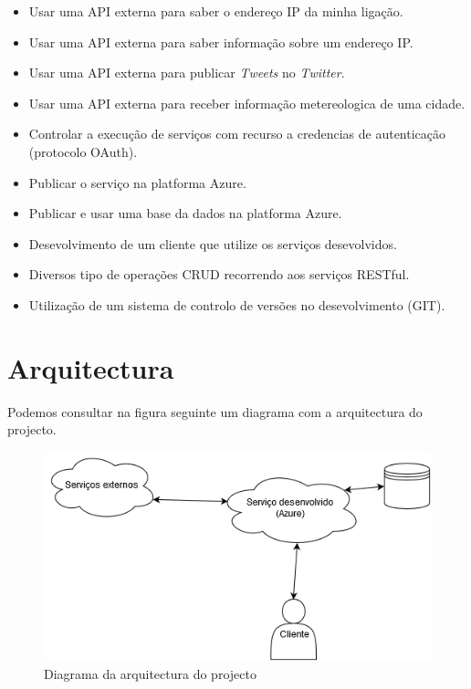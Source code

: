 \documentclass[11pt]{report}
\begin{document}
\begin{itemize}
\item Usar uma API externa para saber o endereço IP da minha ligação.
\item Usar uma API externa para saber informação sobre um endereço IP.
\item Usar uma API externa para publicar \textit{Tweets} no \textit{Twitter}.
\item Usar uma API externa para receber informação metereologica de uma cidade.
\item Controlar a execução de serviços com recurso a credencias de autenticação (protocolo OAuth).
\item Publicar o serviço na platforma Azure.
\item Publicar e usar uma base da dados na platforma Azure.
\item Desevolvimento de um cliente que utilize os serviços desevolvidos.
\item Diversos tipo de operações CRUD recorrendo aos serviços RESTful.
\item Utilização de um sistema de controlo de versões no desevolvimento (GIT).
\end{itemize}


\clearpage


\chapter*{Arquitectura}

Podemos consultar na figura seguinte um diagrama com a arquitectura do projecto.

\begin{figure} [!h]
\centering
\includegraphics[width=\textwidth]{Prints_Trabalho/diagrama.png}
\caption{Diagrama da arquitectura do projecto}
\label{Rotulo}
\end{figure}
\end{document}

